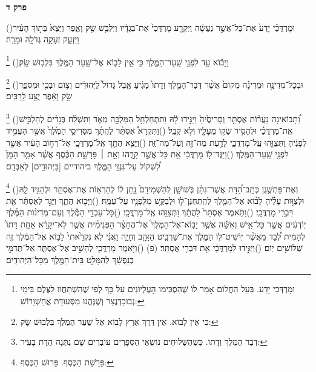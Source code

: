 \documentclass[12pt, openany]{book}
\newcommand{\sethebfont}{
\fontsize{10.5pt}{13.1pt} \selectfont
}
\newcommand{\twocol}[1]{
	{\sethebfont \begin{multicols}{2}
			#1
	\end{multicols}}	
}
\newcommand{\chapname}{}
\newcommand{\newchap}[1]{
	\addcontentsline{toc}{chapter}{#1}
	\renewcommand{\chapname}{#1}
		\begin{center}
			\textbf{%
\fontsize{16pt}{16pt}\selectfont
				#1}
		\end{center}
}
\newcommand{\footnotecomment}[1]{
	\renewcommand\thefootnote{}
	\footnote{#1}}
\newcommand{\commenta}[1]{\footnotecomment{#1}\hspace{0em}}
\newcommand{\vsnum}[1]{(\hebrewnumeral{#1})\space}
\begin{document}
\newchap{פרק ד}
\twocol{\vsnum{1}וּמָרְדֳּכַ֗י יָדַע֙ אֶת־כָּל־אֲשֶׁ֣ר נַעֲשָׂ֔ה וַיִּקְרַ֤ע מָרְדֳּכַי֙ אֶת־בְּגָדָ֔יו וַיִּלְבַּ֥שׁ שַׂ֖ק וָאֵ֑פֶר וַיֵּצֵא֙ בְּת֣וֹךְ הָעִ֔יר וַיִּזְעַ֛ק זְעָקָ֥ה גְדֹלָ֖ה וּמָרָֽה׃%
\commenta{וּמָרְדְּכַי יָדַע. בַּעַל הַחֲלוֹם אָמַר לוֹ שֶׁהִסְכִּימוּ הָעֶלְיוֹנִים עַל כָּךְ לְפִי שֶׁהִשְׁתַּחֲווּ לַצֶּלֶם בִּימֵי נְבוּכַדְנֶצַר וְשֶׁנֶּהֱנוּ מִסְּעוּדַת אֲחַשְׁוֵרוֹשׁ:}%
\vsnum{2}וַיָּב֕וֹא עַ֖ד לִפְנֵ֣י שַֽׁעַר־הַמֶּ֑לֶךְ כִּ֣י אֵ֥ין לָב֛וֹא אֶל־שַׁ֥עַר הַמֶּ֖לֶךְ בִּלְב֥וּשׁ שָֽׂק׃%
\commenta{כִּי אֵין לָבוֹא. אֵין דֶּרֶךְ אֶרֶץ לָבוֹא אֶל שַׁעַר הַמֶּלֶךְ בִּלְבוּשׁ שָׂק:}%
\vsnum{3}וּבְכָל־מְדִינָ֣ה וּמְדִינָ֗ה מְקוֹם֙ אֲשֶׁ֨ר דְּבַר־הַמֶּ֤לֶךְ וְדָתוֹ֙ מַגִּ֔יעַ אֵ֤בֶל גָּדוֹל֙ לַיְּהוּדִ֔ים וְצ֥וֹם וּבְכִ֖י וּמִסְפֵּ֑ד שַׂ֣ק וָאֵ֔פֶר יֻצַּ֖ע לָֽרַבִּֽים׃%
\commenta{דְּבַר הַמֶּלֶךְ וְדָתוֹ. כְּשֶׁהַשְּׁלוּחִים נוֹשְׂאֵי הַסְּפָרִים עוֹבְרִים שָׁם נִתְּנָה הַדָּת בָּעִיר:}%
\vsnum{4}וַ֠תָּבוֹאינָה נַעֲר֨וֹת אֶסְתֵּ֤ר וְסָרִיסֶ֙יהָ֙ וַיַּגִּ֣ידוּ לָ֔הּ וַתִּתְחַלְחַ֥ל הַמַּלְכָּ֖ה מְאֹ֑ד וַתִּשְׁלַ֨ח בְּגָדִ֜ים לְהַלְבִּ֣ישׁ אֶֽת־מָרְדֳּכַ֗י וּלְהָסִ֥יר שַׂקּ֛וֹ מֵעָלָ֖יו וְלֹ֥א קִבֵּֽל׃
\vsnum{5}וַתִּקְרָא֩ אֶסְתֵּ֨ר לַהֲתָ֜ךְ מִסָּרִיסֵ֤י הַמֶּ֙לֶךְ֙ אֲשֶׁ֣ר הֶעֱמִ֣יד לְפָנֶ֔יהָ וַתְּצַוֵּ֖הוּ עַֽל־מָרְדֳּכָ֑י לָדַ֥עַת מַה־זֶּ֖ה וְעַל־מַה־זֶּֽה׃
\vsnum{6}וַיֵּצֵ֥א הֲתָ֖ךְ אֶֽל־מָרְדֳּכָ֑י אֶל־רְח֣וֹב הָעִ֔יר אֲשֶׁ֖ר לִפְנֵ֥י שַֽׁעַר־הַמֶּֽלֶךְ׃
\vsnum{7}וַיַּגֶּד־ל֣וֹ מָרְדֳּכַ֔י אֵ֖ת כָּל־אֲשֶׁ֣ר קָרָ֑הוּ וְאֵ֣ת ׀ פָּרָשַׁ֣ת הַכֶּ֗סֶף אֲשֶׁ֨ר אָמַ֤ר הָמָן֙ לִ֠שְׁקוֹל עַל־גִּנְזֵ֥י הַמֶּ֛לֶךְ ביהודיים [בַּיְּהוּדִ֖ים] לְאַבְּדָֽם׃%
\commenta{פָּרָשַׁת הַכֶּסֶף. פֵּרוּשׁ הַכֶּסֶף:}%
\vsnum{8}וְאֶת־פַּתְשֶׁ֣גֶן כְּתָֽב־הַ֠דָּת אֲשֶׁר־נִתַּ֨ן בְּשׁוּשָׁ֤ן לְהַשְׁמִידָם֙ נָ֣תַן ל֔וֹ לְהַרְא֥וֹת אֶת־אֶסְתֵּ֖ר וּלְהַגִּ֣יד לָ֑הּ וּלְצַוּ֣וֹת עָלֶ֗יהָ לָב֨וֹא אֶל־הַמֶּ֧לֶךְ לְהִֽתְחַנֶּן־ל֛וֹ וּלְבַקֵּ֥שׁ מִלְּפָנָ֖יו עַל־עַמָּֽהּ׃
\vsnum{9}וַיָּב֖וֹא הֲתָ֑ךְ וַיַּגֵּ֣ד לְאֶסְתֵּ֔ר אֵ֖ת דִּבְרֵ֥י מָרְדֳּכָֽי׃
\vsnum{10}וַתֹּ֤אמֶר אֶסְתֵּר֙ לַהֲתָ֔ךְ וַתְּצַוֵּ֖הוּ אֶֽל־מָרְדֳּכָֽי׃
\vsnum{11}כָּל־עַבְדֵ֣י הַמֶּ֡לֶךְ וְעַם־מְדִינ֨וֹת הַמֶּ֜לֶךְ יֽוֹדְעִ֗ים אֲשֶׁ֣ר כָּל־אִ֣ישׁ וְאִשָּׁ֡ה אֲשֶׁ֣ר יָבֽוֹא־אֶל־הַמֶּלֶךְ֩ אֶל־הֶחָצֵ֨ר הַפְּנִימִ֜ית אֲשֶׁ֣ר לֹֽא־יִקָּרֵ֗א אַחַ֤ת דָּתוֹ֙ לְהָמִ֔ית לְ֠בַד מֵאֲשֶׁ֨ר יֽוֹשִׁיט־ל֥וֹ הַמֶּ֛לֶךְ אֶת־שַׁרְבִ֥יט הַזָּהָ֖ב וְחָיָ֑ה וַאֲנִ֗י לֹ֤א נִקְרֵ֙אתי֙ לָב֣וֹא אֶל־הַמֶּ֔לֶךְ זֶ֖ה שְׁלוֹשִׁ֥ים יֽוֹם׃
\vsnum{12}וַיַּגִּ֣ידוּ לְמָרְדֳּכָ֔י אֵ֖ת דִּבְרֵ֥י אֶסְתֵּֽר׃ (פ)
\vsnum{13}וַיֹּ֥אמֶר מָרְדֳּכַ֖י לְהָשִׁ֣יב אֶל־אֶסְתֵּ֑ר אַל־תְּדַמִּ֣י בְנַפְשֵׁ֔ךְ לְהִמָּלֵ֥ט בֵּית־הַמֶּ֖לֶךְ מִכָּל־הַיְּהוּדִֽים׃%
}
\end{document}
